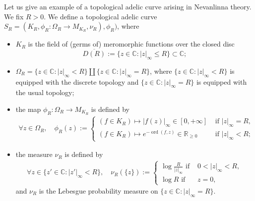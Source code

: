 \documentclass [11pt,reqno]{amsart}
\def\bC{{\mathbb{C}}}
\def\bR{{\mathbb{R}}}
\newcommand{\1}{\mathmybb{1}}
\def\ord{\operatorname{ord}}
\begin{document}
Let us give an example of a topological adelic curve arising in Nevanlinna theory. We fix $R>0$. We define a topological adelic curve $S_{R}=(K_{R},\phi_{R}:\Omega_{R}\to M_{K_{R}},\nu_{R}),\phi_{R})$, where
\begin{itemize}
	\item $K_R$ is the field of (germs of) meromorphic functions over the closed disc 
	$$\overline{D(R)}:= \{z\in\bC : |z|_{\infty}\leq R\} \subset \bC;$$
	\item $\Omega_R = \{z\in\bC:|z|_{\infty}<R\}\coprod \{z\in\bC :|z|_{\infty}=R\}$, where $\{z\in\bC:|z|_{\infty}<R\}$ is equipped with the discrete topology and  $\{z\in\bC :|z|_{\infty}=R\}$ is equipped with the usual topology;
	\item the map $\phi_R : \Omega_R \to M_{K_R}$ is defined by
	\begin{align*}
	\forall z\in \Omega_R, \quad \phi_R(z) := \left\{\begin{matrix}
(f\in K_{R}) \mapsto |f(z)|_{\infty}\in [0,+\infty] &\text{ if } |z|_{\infty}=R,\\
(f\in K_{R}) \mapsto e^{-\ord(f,z)} \in \bR_{\geq 0}&\text{ if } |z|_{\infty}<R;\end{matrix}\right.
	\end{align*}
	\item the measure $\nu_R$ is defined by
	\begin{align*}
	\forall z\in \{z'\in\bC:|z'|_{\infty}<R\}, \quad  \nu_R(\{z\}) := \left\{\begin{matrix}
\log\frac{R}{|z|_{\infty}} \text{ if } &0<|z|_{\infty}<R,\\
\log R \text{ if } &z= 0,\end{matrix}\right.
\end{align*}		
	and $\nu_R$ is the Lebesgue probability measure on $\{z\in\bC :|z|_{\infty}=R\}$.
\end{itemize}
\end{document}
